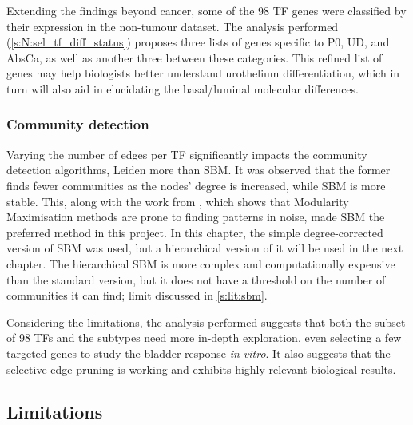 Extending the findings beyond cancer, some of the 98 TF genes were classified by their expression in the non-tumour dataset. The analysis performed (\cref{s:N:sel_tf_diff_status}) proposes three lists of genes specific to P0, UD, and AbsCa, as well as another three between these categories. This refined list of genes may help biologists better understand urothelium differentiation, which in turn will also aid in elucidating the basal/luminal molecular differences.


\subsubsection*{Community detection}

Varying the number of edges per TF significantly impacts the community detection algorithms, Leiden more than SBM. It was observed that the former finds fewer communities as the nodes' degree is increased, while SBM is more stable. This, along with the work from \citet{Peixoto2021-jx, Peixoto2023-rt}, which shows that Modularity Maximisation methods are prone to finding patterns in noise, made SBM the preferred method in this project. In this chapter, the simple degree-corrected version of SBM was used, but a hierarchical version of it will be used in the next chapter. The hierarchical SBM is more complex and computationally expensive than the standard version, but it does not have a threshold on the number of communities it can find; limit discussed in \cref{s:lit:sbm}.


Considering the limitations, the analysis performed suggests that both the subset of 98 TFs and the subtypes need more in-depth exploration, even selecting a few targeted genes to study the bladder response \textit{in-vitro}. It also suggests that the selective edge pruning is working and exhibits highly relevant biological results.

\subsection* {Limitations}

